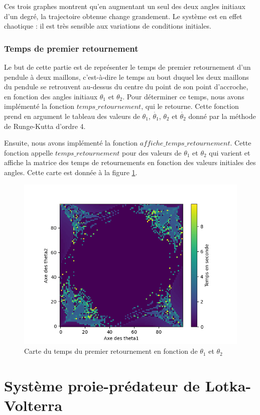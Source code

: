 \documentclass{article}
\begin{document}
Ces trois graphes montrent qu'en augmentant un seul des deux angles initiaux d'un degré, la trajectoire obtenue change grandement. Le système est en effet chaotique : il est très sensible aux variations de conditions initiales.   


\subsubsection{Temps de premier retournement}

Le but de cette partie est de représenter le temps de premier retournement d'un pendule à deux maillons, c'est-à-dire le temps au bout duquel les deux maillons du pendule se retrouvent au-dessus du centre du point de son point d'accroche, en fonction des angles initiaux $\theta_1$ et $\theta_2$. Pour déterminer ce temps, nous avons implémenté la fonction $temps\_retournement$, qui le retourne. Cette fonction prend en argument le tableau des valeurs de $\theta_1$, $\Dot{\theta_1}$, $\theta_2$ et $\Dot{\theta_2}$ donné par la méthode de Runge-Kutta d’ordre 4. 

Ensuite, nous avons implémenté la fonction $affiche\_temps\_retournement$. Cette fonction appelle $temps\_retournement$ pour des valeurs de $\theta_1$ et $\theta_2$ qui varient et affiche la matrice des temps de retournements en fonction des valeurs initiales des angles. Cette carte est donnée à la figure \ref{fig:retournement}.

\begin{figure}[ht!]
    \centering
    \includegraphics[width=0.5\linewidth]{temps.png}
    \caption{Carte du temps du premier retournement en fonction de $\theta_1$ et $\theta_2$}
    \label{fig:retournement}
\end{figure}



\section{Système proie-prédateur de Lotka-Volterra}
\end{document}
